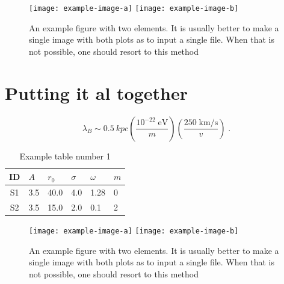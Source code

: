 \begin{figure}[h!]
	\centering
	\texttt{[image: example-image-a]}
	\texttt{[image: example-image-b]}
	\caption{An example figure with two elements. It is usually better to make a single image with both plots as to input a single file. When that is not possible, one should resort to this method}
	\label{fig1:side_by_side_image}
\end{figure}

\vfill
\pagebreak
\section{Putting it al together}

\lipsum[5]

\begin{equation}
	\lambda_B \sim \SI{0.5}{kpc} \left( \frac{ 10^{-22} \; \text{eV} }{m} \right) \left( \frac{ 250 \; \text{km/s} }{v} \right) \;.
\end{equation}

\lipsum[10]

\begin{table}[h]
	\caption{Example table number 1}
	\label{table:example_table_2}
	\centering
	\begin{tabular}{clllll}
		\toprule
		\midrule[0.4pt]
		ID&$A$  & $r_0$  &  $\sigma$ &  $\omega$  &  $m$  \\
		\midrule
		S1 & 3.5 & 40.0 & 4.0 & 1.28 & 0 \\
		S2 & 3.5 & 15.0 & 2.0 & 0.1 & 2 \\
		\bottomrule
	\end{tabular}
\end{table}

\lipsum[2]

\begin{figure}[t!]
	\centering
	\texttt{[image: example-image-a]}
	\texttt{[image: example-image-b]}
	\caption{An example figure with two elements. It is usually better to make a single image with both plots as to input a single file. When that is not possible, one should resort to this method}
	\label{fig1:side_by_side_image_2}
\end{figure}

\lipsum